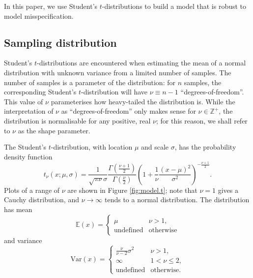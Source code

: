 \documentclass[fleqn,usenatbib]{mnras}
\begin{document}
In this paper, we use Student's $t$-distributions to build a model that is
robust to model misspecification.

\subsection{Sampling distribution}
\label{sec:formalism.sampling}

Student's $t$-distributions are encountered when estimating the mean of a normal
distribution with unknown variance from a limited number of samples. The number
of samples is a parameter of the distribution: for $n$ samples, the
corresponding Student's $t$-distribution will have $\nu \equiv n - 1$
``degrees-of-freedom''. This value of $\nu$ parameterises how heavy-tailed the
distribution is. While the interpretation of $\nu$ as ``degrees-of-freedom''
only makes sense for $\nu \in \mathbb Z^+$, the distribution is normalisable for
any positive, real $\nu$; for this reason, we shall refer to $\nu$ as the shape
parameter.

The Student's $t$-distribution, with location $\mu$ and scale $\sigma$, has
the probability density function
\begin{equation}
    t_{\nu} \left(x; {\mu}, {\sigma}\right)
        =
    \frac{1}{\sqrt{\pi \nu} \sigma}
    \frac{
        \Gamma \left(\frac{\nu + 1}2\right)
    }{
        \Gamma \left(\frac{\nu}2\right)
    }
    \left(
        1 + \frac{1}{\nu} \frac{\left(x - \mu\right)^2}{\sigma^2}
    \right)^{
        -\frac{\nu + 1}{2}
    }.
\end{equation}
Plots of a range of $\nu$ are shown in Figure \ref{fig:model.t}; note that $\nu
= 1$ gives a Cauchy distribution, and $\nu \rightarrow \infty$ tends to a normal
distribution. The distribution has mean
\begin{equation}
    \mathbb{E}(x)
        =
    \begin{cases}
        \mu & \nu > 1, \\
        \textrm{undefined} & \textrm{otherwise}
    \end{cases}
\end{equation}
and variance
\begin{equation}
    \mathrm{Var}(x)
        =
    \begin{cases}
        \frac{\nu}{\nu - 2} \sigma^2 & \nu > 1, \\
        \infty & 1 < \nu \leq 2, \\
        \textrm{undefined} & \textrm{otherwise.}
    \end{cases}
\end{equation}
\end{document}
